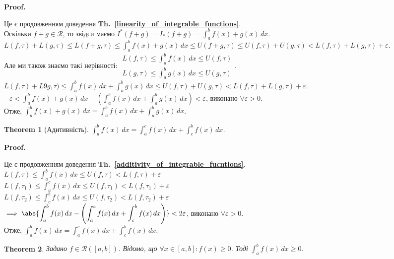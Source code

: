 \documentclass[a4paper, 10pt]{article}
\makeatletter
\def\huge{\displaystyle}
\def\qed{$\blacksquare$}
\theoremstyle{theoremdd}
\newtheorem{theorem}{Theorem}[subsection]
\theoremstyle{theoremdd}
\theoremstyle{theoremdd}
\theoremstyle{theoremdd}
\theoremstyle{theoremdd}
\theoremstyle{theoremdd}
\theoremstyle{theoremdd}
\theoremstyle{theoremdd}
\theoremstyle{theoremdd}
\newcommand\thref[1]{\textbf{Th.~\ref{#1}}}
\renewenvironment{proof}[1][Proof.\\]{\par
\pushQED{\hfill \qed}%
\normalfont \topsep6\p@\@plus6\p@\relax
\trivlist
\item\relax
{\bfseries
#1\@addpunct{.}}\hspace\labelsep\ignorespaces
}{%
\popQED\endtrivlist\@endpefalse
}
\makeatother
\begin{document}
\begin{proof}
Це є продовженням доведення \thref{linearity_of_integrable_functions}.\\
Оскільки $f+g \in \mathcal{R}$, то звідси маємо $I^*(f+g) = I_*(f+g) = \huge\int_a^b f(x)+g(x)\,dx$.\\
$L(f,\tau) + L(g,\tau) \leq L(f+g,\tau) \leq \huge\int_a^b f(x)+g(x)\,dx \leq U(f+g,\tau) \leq U(f, \tau) + U(g,\tau) < L(f,\tau) + L(g,\tau) + \varepsilon$.\\
Але ми також знаємо такі нерівності: $\begin{gathered}
L(f,\tau) \leq \huge\int_a^b f(x)\,dx \leq U(f, \tau)\\
L(g,\tau) \leq \huge\int_a^b g(x)\,dx \leq U(g,\tau)
\end{gathered}$.\\
$L(f,\tau) + L9g,\tau) \leq \huge\int_a^b f(x)\,dx + \int_a^b g(x)\,dx \leq U(f,\tau) + U(g,\tau) < L(f,\tau) + L(g,\tau) + \varepsilon$.\\
$-\varepsilon < \huge\int_a^b f(x)+g(x)\,dx - \left( \int_a^b f(x)\,dx + \int_a^b g(x)\,dx \right) < \varepsilon$, виконано $\forall \varepsilon > 0$.\\
Отже, $\huge\int_a^b f(x)+g(x)\,dx = \int_a^b f(x)\,dx + \int_a^b g(x)\,dx$.
\end{proof}

\begin{theorem}[Адитивність]
$\huge\int_a^b f(x)\,dx = \int_a^c f(x)\,dx + \int_c^b f(x)\,dx$.
\end{theorem}

\begin{proof}
Це є продовженням доведення \thref{additivity_of_integrable_fucntions}.\\
$L(f,\tau) \leq \huge\int_a^b f(x)\,dx \leq U(f, \tau) < L(f,\tau) + \varepsilon$\\
$L(f,\tau_1) \leq \huge\int_a^c f(x)\,dx \leq U(f,\tau_1) < L(f,\tau_1) + \varepsilon$\\
$L(f,\tau_2) \leq \huge\int_c^b f(x)\,dx \leq U(f,\tau_2) < L(f,\tau_2) + \varepsilon$\\
$\implies \abs{\huge\int_a^b f(x) \,dx - \left( \int_a^c f(x)\,dx + \int_c^b f(x)\,dx \right)} < 2\varepsilon$, виконано $\forall \varepsilon > 0$.\\
Отже, $\huge\int_a^b f(x)\,dx = \int_a^c f(x)\,dx + \int_c^b f(x)\,dx$.
\end{proof}

\begin{theorem}
Задано $f \in \mathcal{R}([a,b])$. Відомо, що $\forall x \in [a,b]: f(x) \geq 0$. Тоді $\huge\int_a^b f(x)\,dx \geq 0$.
\end{theorem}
\end{document}
